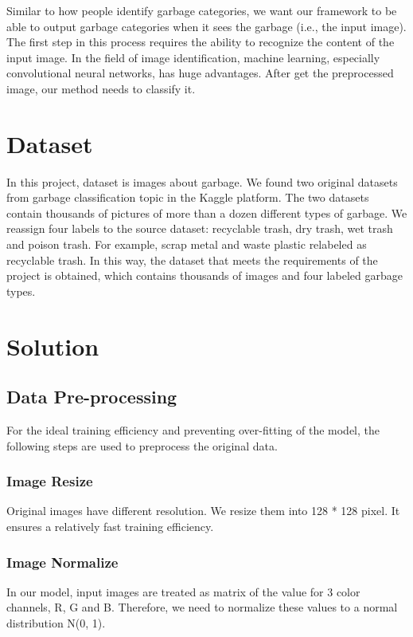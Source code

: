 \documentclass{article}
\begin{document}
Similar to how people identify garbage categories, we want our framework to be able to output garbage categories when it sees the garbage (i.e., the input image). The first step in this process requires the ability to recognize the content of the input image. In the field of image identification, machine learning, especially convolutional neural networks\cite{lecun1995convolutional}, has huge advantages. After get the preprocessed image, our method needs to classify it.



\section*{Dataset}

In this project, dataset is images about garbage. We found two original datasets from garbage classification topic in the Kaggle platform\cite{Kaggle_dataset_6,Kaggle_dataset_12}. The two datasets contain thousands of pictures of more than a dozen different types of garbage. We reassign four labels to the source dataset: recyclable trash, dry trash, wet trash and poison trash. For example, scrap metal and waste plastic relabeled as recyclable trash. In this way, the dataset that meets the requirements of the project is obtained, which contains thousands of images and four labeled garbage types.


\section*{Solution}

    \subsection*{Data Pre-processing}
    For the ideal training efficiency and preventing over-fitting of the model, the following steps are used to preprocess the original data.
    
        \subsubsection*{Image Resize}
        Original images have different resolution. We resize them into 128 * 128 pixel. It ensures a relatively fast training efficiency.
        
        \subsubsection*{Image Normalize}
        In our model, input images are treated as matrix of the value for 3 color channels, R, G and B. Therefore, we need to normalize these values to a normal distribution N(0, 1).
        
\end{document}
